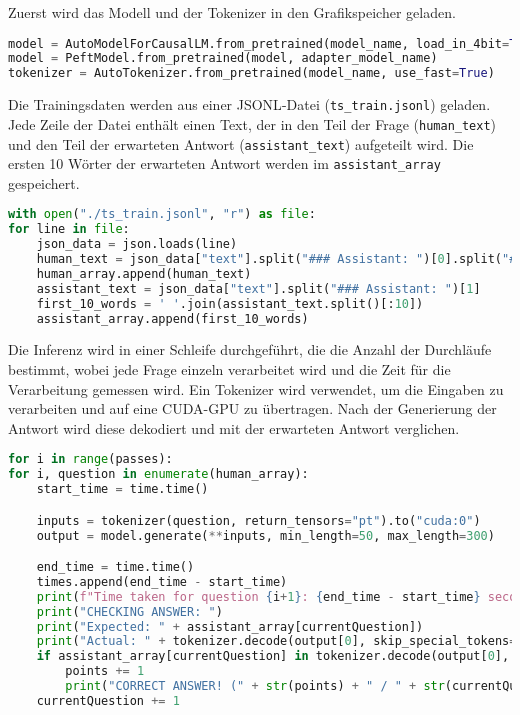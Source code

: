 \documentclass[german,report]{i1thesis}
\begin{document}
Zuerst wird das Modell und der Tokenizer in den Grafikspeicher geladen.\\

\begin{lstlisting}[language=Python]
model = AutoModelForCausalLM.from_pretrained(model_name, load_in_4bit=True)
model = PeftModel.from_pretrained(model, adapter_model_name)
tokenizer = AutoTokenizer.from_pretrained(model_name, use_fast=True)
\end{lstlisting}

Die Trainingsdaten werden aus einer \ac{JSONL}-Datei (\texttt{ts\_train.jsonl}) geladen.
Jede Zeile der Datei enthält einen Text, der in den Teil der Frage (\texttt{human\_text}) und den Teil der erwarteten Antwort (\texttt{assistant\_text}) aufgeteilt wird.
Die ersten 10 Wörter der erwarteten Antwort werden im \texttt{assistant\_array} gespeichert.\\

\begin{lstlisting}[language=Python]
with open("./ts_train.jsonl", "r") as file:
for line in file:
    json_data = json.loads(line)
    human_text = json_data["text"].split("### Assistant: ")[0].split("### Human: ")[1]
    human_array.append(human_text)
    assistant_text = json_data["text"].split("### Assistant: ")[1]
    first_10_words = ' '.join(assistant_text.split()[:10])
    assistant_array.append(first_10_words)
\end{lstlisting}



Die Inferenz wird in einer Schleife durchgeführt, die die Anzahl der Durchläufe bestimmt, wobei jede Frage einzeln verarbeitet wird und die Zeit für die Verarbeitung gemessen wird.
Ein Tokenizer wird verwendet, um die Eingaben zu verarbeiten und auf eine \ac{CUDA}-\ac{GPU} zu übertragen.
Nach der Generierung der Antwort wird diese dekodiert und mit der erwarteten Antwort verglichen.\\


\begin{lstlisting}[language=Python]for i in range(passes):
for i, question in enumerate(human_array):
    start_time = time.time()

    inputs = tokenizer(question, return_tensors="pt").to("cuda:0")
    output = model.generate(**inputs, min_length=50, max_length=300)

    end_time = time.time()
    times.append(end_time - start_time)
    print(f"Time taken for question {i+1}: {end_time - start_time} seconds")
    print("CHECKING ANSWER: ")
    print("Expected: " + assistant_array[currentQuestion])
    print("Actual: " + tokenizer.decode(output[0], skip_special_tokens=True))
    if assistant_array[currentQuestion] in tokenizer.decode(output[0], skip_special_tokens=True):
        points += 1
        print("CORRECT ANSWER! (" + str(points) + " / " + str(currentQuestion+1) + ")")
    currentQuestion += 1
\end{lstlisting}
\end{document}
